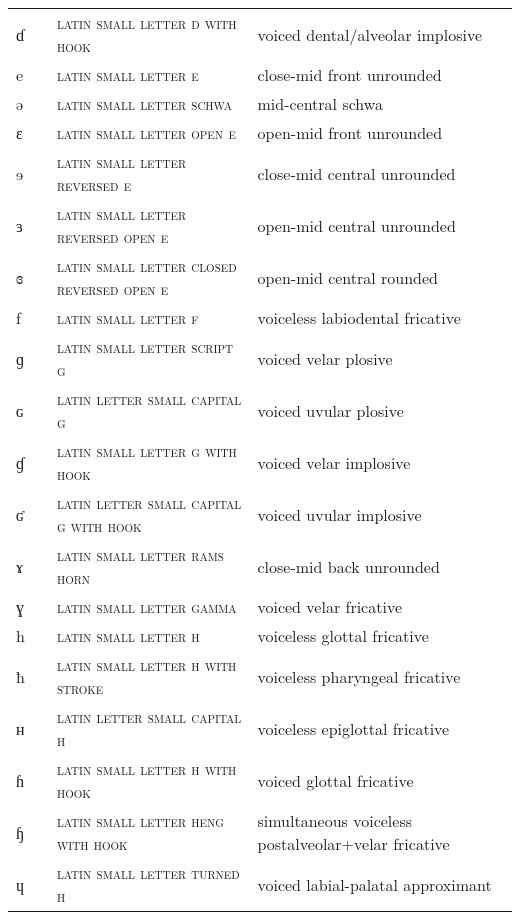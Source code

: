 \begin{center}
\begin{xtabular}{ l L{1.2cm} L{5.4cm} L{4.2cm} }
ɗ &  & \textsc{latin small letter d with hook} & voiced dental/alveolar implosive \\ 
e &  & \textsc{latin small letter e} & close-mid front unrounded \\ 
ə &  & \textsc{latin small letter schwa} & mid-central schwa \\ 
ɛ &  & \textsc{latin small letter open e} & open-mid front unrounded \\ 
ɘ &  & \textsc{latin small letter reversed e} & close-mid central unrounded \\ 
ɜ &  & \textsc{latin small letter reversed open e} & open-mid central unrounded \\ 
ɞ &  & \textsc{latin small letter closed reversed open e} & open-mid central rounded \\ 
f &  & \textsc{latin small letter f} & voiceless labiodental fricative \\ 
ɡ &  & \textsc{latin small letter script g} & voiced velar plosive \\ 
ɢ &  & \textsc{latin letter small capital g} & voiced uvular plosive \\ 
ɠ &  & \textsc{latin small letter g with hook} & voiced velar implosive \\ 
ʛ &  & \textsc{latin letter small capital g with hook} & voiced uvular implosive \\ 
ɤ &  & \textsc{latin small letter rams horn} & close-mid back unrounded \\ 
ɣ &  & \textsc{latin small letter gamma} & voiced velar fricative \\ 
h &  & \textsc{latin small letter h} & voiceless glottal fricative \\ 
ħ &  & \textsc{latin small letter h with stroke} & voiceless pharyngeal fricative \\ 
ʜ &  & \textsc{latin letter small capital h} & voiceless epiglottal fricative \\ 
ɦ &  & \textsc{latin small letter h with hook} & voiced glottal fricative \\ 
ɧ &  & \textsc{latin small letter heng with hook} & simultaneous voiceless postalveolar+velar fricative \\ 
ɥ &  & \textsc{latin small letter turned h} & voiced labial-palatal approximant \\ 

\end{xtabular}
\end{center}
